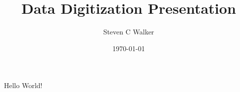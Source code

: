 \documentclass{article}
\title{Data Digitization Presentation}
\date{\today}
\author{Steven C Walker}
\begin{document}
  \maketitle
  \newpage

  Hello World!
\end{document}
